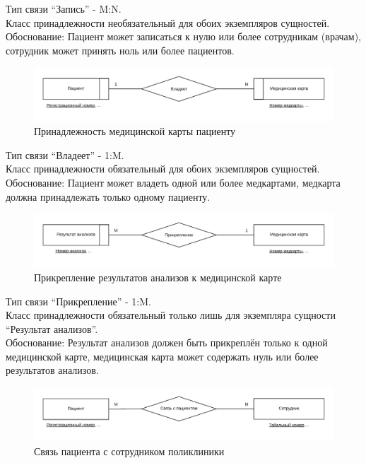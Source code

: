 \documentclass[14pt,a4paper,russian]{extreport}
\begin{document}
\noindent Тип связи ``Запись'' - M:N.\\
Класс принадлежности необязательный для обоих экземпляров сущностей.
Обоснование: Пациент может записаться к нулю или более сотрудникам (врачам), сотрудник может принять ноль или более
пациентов. \par

\begin{figure}[h!]
        \includegraphics[width=\textwidth]{medcbelpat}
        \caption{Принадлежность медицинской карты пациенту}
        \label{fig:medcbelpat}
\end{figure}

\noindent Тип связи ``Владеет'' - 1:M.\\
Класс принадлежности обязательный для обоих экземпляров сущностей.\\
Обоснование: Пациент может владеть одной или более медкартами, медкарта должна принадлежать
только одному пациенту.\par

\begin{figure}[h!]
        \includegraphics[width=\textwidth]{cardan}
        \caption{Прикрепление результатов анализов к медицинской карте}
        \label{fig:cardan}
\end{figure}

\noindent Тип связи ``Прикрепление'' - 1:M.\\
Класс принадлежности обязательный только лишь для экземпляра сущности ``Результат анализов''.\\
Обоснование: Результат анализов должен быть прикреплён только к одной медицинской карте, медицинская карта
может содержать нуль или более результатов анализов.\par
\newpage

\begin{figure}[h!]
        \includegraphics[width=\textwidth]{patlinkemp}
        \caption{Связь пациента с сотрудником поликлиники}
        \label{fig:patlinkemp}
\end{figure}
\end{document}
